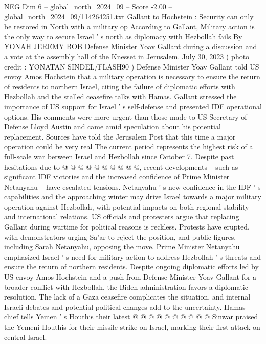 \begin{textsample}{NEG Dim 6 – global\_north\_2024\_09 – Score -2.00 – global\_north\_2024\_09/114264251.txt}  \label{ex:f6_neg_018}
Gallant to Hochstein : Security can only be restored in North with a military op According to Gallant, Military action is the only way to secure Israel ' s north as diplomacy with Hezbollah fails By YONAH JEREMY BOB Defense Minister Yoav Gallant during a discussion and a vote at the assembly hall of the Knesset in Jerusalem.
July 30, 2023 ( photo credit : YONATAN SINDEL/FLASH90 ) Defense Minister Yoav Gallant told US envoy Amos Hochstein that a military operation is necessary to ensure the return of residents to northern Israel, citing the failure of diplomatic efforts with Hezbollah and the stalled ceasefire talks with Hamas.
Gallant stressed the importance of US support for Israel ' s self-defense and presented IDF operational options.
His comments were more urgent than those made to US Secretary of Defense Lloyd Austin and came amid speculation about his potential replacement.
Sources have told the Jerusalem Post that this time a major operation could be very real The current period represents the highest risk of a full-scale war between Israel and Hezbollah since October 7.
Despite past hesitations due to @ @ @ @ @ @ @ @ @ @, recent developments -- such as significant IDF victories and the increased confidence of Prime Minister Netanyahu -- have escalated tensions.
Netanyahu ' s new confidence in the IDF ' s capabilities and the approaching winter may drive Israel towards a major military operation against Hezbollah, with potential impacts on both regional stability and international relations.
US officials and protesters argue that replacing Gallant during wartime for political reasons is reckless.
Protests have erupted, with demonstrators urging Sa'ar to reject the position, and public figures, including Sarah Netanyahu, opposing the move.
Prime Minister Netanyahu emphasized Israel ' s need for military action to address Hezbollah ' s threats and ensure the return of northern residents.
Despite ongoing diplomatic efforts led by US envoy Amos Hochstein and a push from Defense Minister Yoav Gallant for a broader conflict with Hezbollah, the Biden administration favors a diplomatic resolution.
The lack of a Gaza ceasefire complicates the situation, and internal Israeli debates and potential political changes add to the uncertainty.
Hamas chief tells Yemen ' s Houthis their latest @ @ @ @ @ @ @ @ @ @ Sinwar praised the Yemeni Houthis for their missile strike on Israel, marking their first attack on central Israel.

\end{textsample}
